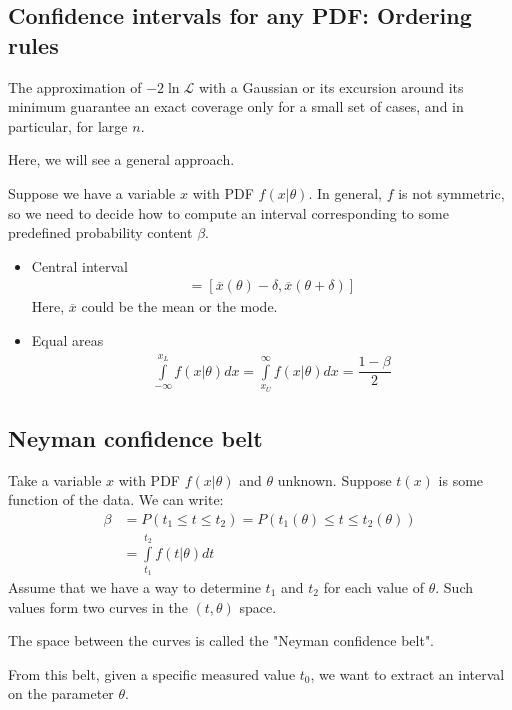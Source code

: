 \subsection{Confidence intervals for any PDF: Ordering rules} \label{confidence_int_ordering_rules}
The approximation of $-2\ln\mathcal{L}$ with a Gaussian or its excursion around its minimum guarantee an exact coverage only for a small set of cases, and in particular, for large $n$.

Here, we will see a general approach. 

Suppose we have a variable $x$ with PDF $f(x|\theta)$. In general, $f$ is not symmetric, so we need to decide how to compute an interval corresponding to some predefined probability content $\beta$. 

\begin{itemize}[$\to$]
    \item Central interval
    \begin{align}
    [x_L(\theta), x_U(\theta)] = [\overline{x}(\theta)-\delta, \overline{x}(\theta + \delta)]
\end{align}
Here, $\overline{x}$ could be the mean or the mode.  
\item Equal areas 
\begin{align}
    \int \limits_{-\infty}^{x_L} f(x|\theta) dx = \int \limits_{x_U}^{\infty}f(x|\theta) dx = \dfrac{1-\beta}{2}
\end{align} 
\end{itemize}

\subsection{Neyman confidence belt}
Take a variable $x$ with PDF $f(x|\theta)$ and $\theta$ unknown. Suppose $t(x)$ is some function of the data. We can write: 
\begin{align}
    \beta &= P(t_1 \leq t \leq t_2) = P (t_1(\theta) \leq t \leq t_2(\theta)) \\
    &= \int\limits_{t_1}^{t_2} f(t|\theta) dt 
\end{align}
Assume that we have a way to determine $t_1$ and $t_2$ for each value of $\theta$. Such values form two curves in the $(t,\theta)$ space. 

The space between the curves is called the "Neyman confidence belt".

From this belt, given a specific measured value $t_0$, we want to extract an interval on the parameter $\theta$. 

